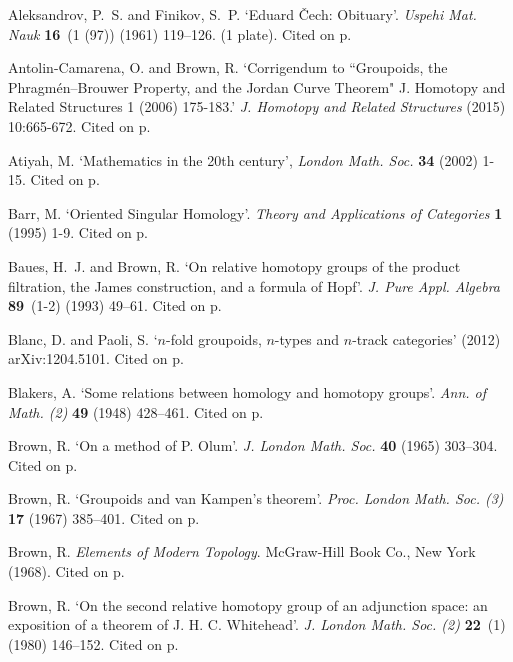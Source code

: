 \documentclass{elsarticle}
\begin{document}
\begin{thebibliography}{MLW50}
\newcommand{\enquote}[1]{`#1'}

Aleksandrov, P.~S. and Finikov, S.~P.
\newblock \enquote{Eduard \v {C}ech: {O}bituary}.
\newblock \emph{Uspehi Mat. Nauk} \textbf{16}~(1 (97)) (1961) 119--126. (1
  plate). Cited on p.

Antolin-Camarena, O. and Brown, R.
\newblock \enquote{Corrigendum to ``Groupoids, the Phragm\'en--Brouwer Property, and the Jordan Curve Theorem" J. Homotopy and Related Structures 1 (2006) 175-183.}
\newblock \emph{J. Homotopy and Related Structures} (2015) 10:665-672.  Cited on p.


Atiyah, M.
\newblock \enquote{Mathematics in the 20th century},
\newblock \emph{ London Math. Soc.} \textbf{34} (2002) 1-15.  Cited on p.

Barr, M.
\newblock \enquote{Oriented Singular Homology}.
\newblock \emph{Theory and Applications of Categories} \textbf{1} (1995) 1-9.  Cited on p.

Baues, H.~J. and Brown, R.
\newblock \enquote{On relative homotopy groups of the product filtration, the
  {J}ames construction, and a formula of {H}opf}.
\newblock \emph{J. Pure Appl. Algebra} \textbf{89}~(1-2) (1993) 49--61.  Cited on p.

Blanc, D. and Paoli, S.
\newblock \enquote{$n$-fold groupoids, $n$-types and $n$-track categories}
(2012)  arXiv:1204.5101.  Cited on p.

Blakers, A.
\newblock \enquote{Some relations between homology and homotopy groups}.
\newblock \emph{Ann. of Math. (2)} \textbf{49} (1948) 428--461.  Cited on p.

Brown, R.
\newblock \enquote{On a method of {P}. {O}lum}.
\newblock \emph{J. London Math. Soc.} \textbf{40} (1965) 303--304.  Cited on p.

Brown, R.
\newblock \enquote{Groupoids and van {K}ampen's theorem}.
\newblock \emph{Proc. London Math. Soc. (3)} \textbf{17} (1967) 385--401.  Cited on p.

Brown, R.
\newblock \emph{Elements of {M}odern {T}opology}.
\newblock McGraw-Hill Book Co., New York (1968).  Cited on p.

Brown, R.
\newblock \enquote{On the second relative homotopy group of an adjunction
  space: an exposition of a theorem of {J}. {H}. {C}. {W}hitehead}.
\newblock \emph{J. London Math. Soc. (2)} \textbf{22}~(1) (1980) 146--152.  Cited on p.


\end{thebibliography}
\end{document}
